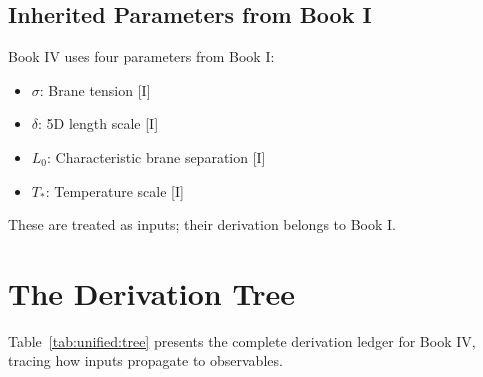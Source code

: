 \subsection{Inherited Parameters from Book I}

Book IV uses four parameters from Book I:
\begin{itemize}
    \item $\sigma$: Brane tension [I]
    \item $\delta$: 5D length scale [I]
    \item $L_0$: Characteristic brane separation [I]
    \item $T_*$: Temperature scale [I]
\end{itemize}

These are treated as inputs; their derivation belongs to Book I.

\section{The Derivation Tree}
\label{sec:unified:tree}

Table~\ref{tab:unified:tree} presents the complete derivation ledger for
Book IV, tracing how inputs propagate to observables.

